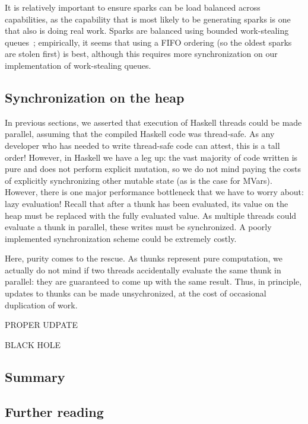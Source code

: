 It is relatively important to ensure sparks can be load balanced across
capabilities, as the capability that is most likely to be generating
sparks is one that also is doing real work.  Sparks are balanced using
bounded work-stealing queues~\XXX; empirically, it seems that using a FIFO
ordering (so the oldest sparks are stolen first) is best, although this
requires more synchronization on our implementation of work-stealing
queues.


\subsection{Synchronization on the heap}

In previous sections, we asserted that execution of Haskell threads
could be made parallel, assuming that the compiled Haskell code was
thread-safe.  As any developer who has needed to write thread-safe code
can attest, this is a tall order!  However, in Haskell we have a leg up:
the vast majority of code written is pure and does not perform explicit
mutation, so we do not mind paying the costs of explicitly synchronizing
other mutable state (as is the case for MVars). However, there is one
major performance bottleneck that we have to worry about: lazy
evaluation!  Recall that after a thunk has been evaluated, its value on
the heap must be replaced with the fully evaluated value.  As multiple
threads could evaluate a thunk in parallel, these writes must be
synchronized. A poorly implemented synchronization scheme could be
extremely costly.

Here, purity comes to the rescue.  As thunks represent pure computation,
we actually do not mind if two threads accidentally evaluate the same
thunk in parallel: they are guaranteed to come up with the same result.
Thus, in principle, updates to thunks can be made unsychronized, at the
cost of occasional duplication of work.

PROPER UDPATE

BLACK HOLE


\subsection{Summary}

\subsection{Further reading}
